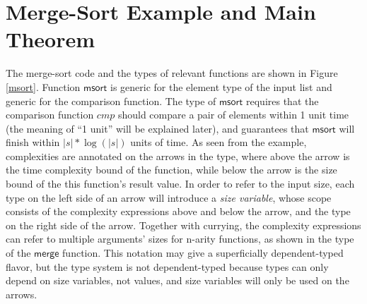 \documentclass[preprint]{sigplanconf}
\newcommand{\symmerge}{\mathsf{merge}}
\newcommand{\symmsort}{\mathsf{msort}}
\begin{document}
\section{\label{section-example}Merge-Sort Example and Main Theorem}

The merge-sort code and the types of relevant functions are shown in Figure \ref{msort}. Function $\symmsort$ is generic for the element type of the input list and generic for the comparison function. The type of $\symmsort$ requires that the comparison function $cmp$ should compare a pair of elements within 1 unit time (the meaning of ``1 unit'' will be explained later), and guarantees that $\symmsort$ will finish within $|s|*\log(|s|)$ units of time. As seen from the example, complexities are annotated on the arrows in the type, where above the arrow is the time complexity bound of the function, while below the arrow is the size bound of the this function's result value. In order to refer to the input size, each type on the left side of an arrow will introduce a \emph{size variable}, whose scope consists of the complexity expressions above and below the arrow, and the type on the right side of the arrow. Together with currying, the complexity expressions can refer to multiple arguments' sizes for n-arity functions, as shown in the type of the $\symmerge$ function. This notation may give a superficially dependent-typed flavor, but the type system is not dependent-typed because types can only depend on size variables, not values, and size variables will only be used on the arrows.
\end{document}
